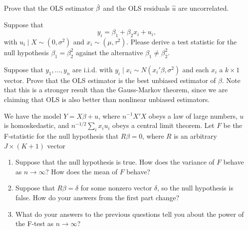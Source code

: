 

\begin{hw}
  Prove that the OLS estimator $\hat{\beta}$ and the OLS residuals $\hat u$
  are uncorrelated.
\end{hw}

\begin{hw}
  Suppose that
  \begin{equation}
    y_i = \beta_1 + \beta_2 x_i + u_i,
  \end{equation}
  with $u_i \mid X \sim (0, \sigma^2)$ and $x_i \sim (\mu,\tau^2)$.
  Please derive a test statistic for the null hypothesis $\beta_1 =
  \beta_2^2$ against the alternative $\beta_1 \neq \beta_2^2$.
\end{hw}

\begin{hw}
  Suppose that $y_1,\dots,y_n$ are i.i.d. with $y_i \mid x_i \sim
  N(x_i'\beta, \sigma^2)$ and each $x_i$ a $k \times 1$ vector. Prove
  that the OLS estimator is the best unbiased estimator of $\beta$.
  Note that this is a stronger result than the Gauss-Markov theorem,
  since we are claiming that OLS is also better than nonlinear
  unbiased estimators.
\end{hw}

\begin{hw}
  We have the model $Y = X\beta + u$, where $n^{-1} X'X$ obeys a law
  of large numbers, $u$ is homoskedastic, and $n^{-1/2} \sum_i x_i
  u_i$ obeys a central limit theorem. Let $F$ be the F-statistic for
  the null hypothesis that $R\beta = 0$, where $R$ is an arbitrary $J
  \times (K + 1)$ vector
  \begin{enumerate}
  \item Suppose that the null hypothesis is true. How does the
    variance of $F$ behave as $n \to \infty$? How does the mean of
    $F$ behave?
  \item Suppose that $R\beta = \delta$ for some nonzero vector
    $\delta$, so the null hypothesis is false. How do your answers
    from the first part change?
  \item What do your answers to the previous questions tell you about
    the power of the F-test as $n \to \infty$?
  \end{enumerate}
\end{hw}

